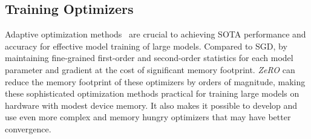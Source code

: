\documentclass{article}
\newcommand{\name}{\emph{ZeRO}\xspace}
\begin{document}
\subsection{Training Optimizers }
Adaptive optimization methods~\cite{10.5555/Adagrad,DBLP:journals/corr/Adam,DBLP:journals/corr/You-LARS,DBLP:journals/corr/You-LAMB} are crucial to achieving SOTA performance and accuracy for effective model training of large models.  Compared to SGD, by maintaining fine-grained first-order and second-order statistics for each model parameter and gradient at the cost of significant memory footprint. \name can reduce the memory footprint of these optimizers by orders of magnitude, making these sophisticated optimization methods practical for training large models on hardware with modest device memory. It also makes it possible to develop and use even more complex and memory hungry optimizers that may have better convergence.  

\end{document}
